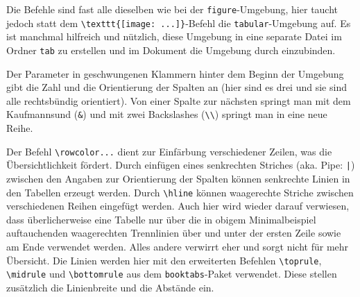 Die Befehle sind fast alle dieselben wie bei der \verb|figure|-Umgebung, hier taucht jedoch statt dem \verb|\texttt{[image: ...]}|-Befehl die \verb|tabular|-Umgebung auf. Es ist manchmal hilfreich und nützlich, diese Umgebung in eine separate Datei im Ordner \verb|tab| zu erstellen und im Dokument die Umgebung durch \verb|| einzubinden.

Der Parameter in geschwungenen Klammern hinter dem Beginn der Umgebung gibt die Zahl und die Orientierung der Spalten an (hier sind es drei und sie sind alle rechtsbündig orientiert). Von einer Spalte zur nächsten springt man mit dem Kaufmannsund (\verb|&|) und mit zwei Backslashes (\verb|\\|) springt man in eine neue Reihe.

Der Befehl \verb|\rowcolor...| dient zur Einfärbung verschiedener Zeilen, was die Übersichtlichkeit fördert. Durch einfügen eines senkrechten Striches (aka. Pipe: \verb&|&) zwischen den Angaben zur Orientierung der Spalten können senkrechte Linien in den Tabellen erzeugt werden. Durch \verb|\hline| können waagerechte Striche zwischen verschiedenen Reihen eingefügt werden. Auch hier wird wieder darauf verwiesen, dass überlicherweise eine Tabelle nur über die in obigem Minimalbeispiel auftauchenden waagerechten Trennlinien über und unter der ersten Zeile sowie am Ende verwendet werden.  Alles andere verwirrt eher und sorgt nicht für mehr Übersicht. Die Linien werden hier mit den erweiterten Befehlen \verb|\toprule|, \verb|\midrule| und \verb|\bottomrule| aus dem \verb|booktabs|-Paket verwendet. Diese stellen zusätzlich die Linienbreite und die Abstände ein.